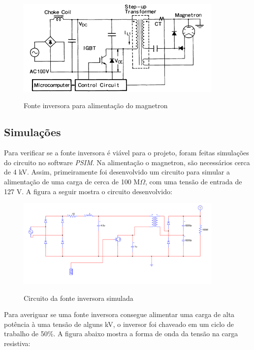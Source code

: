 \begin{figure}[!htb]
    \centering
    \caption{Fonte inversora para alimentação do magnetron}
    \includegraphics[width=0.9\textwidth]{./dados/figuras/font_inverter}
    \label{fig:figura-inverter}
\end{figure}

\subsection{Simulações}
\label{sec:simulations}

Para verificar se a fonte inversora é viável para o projeto, foram feitas simulações do circuito no software \textit{PSIM}. Na alimentação o magnetron, são necessários cerca de 4 kV. Assim, primeiramente foi desenvolvido um circuito para simular a alimentação de uma carga de cerca de 100 M$\Omega$, com uma tensão de entrada de 127 V. A figura a seguir mostra o circuito desenvolvido:

\begin{figure}[!htb]
    \centering
    \caption{Circuito da fonte inversora simulada}
    \includegraphics[width=0.9\textwidth]{./dados/figuras/psim1}
    \label{fig:circ_sim_1}
\end{figure}

Para averiguar se uma fonte inversora consegue alimentar uma carga de alta potência à uma tensão de alguns kV, o inversor foi chaveado em um ciclo de trabalho de 50\%. A figura abaixo mostra a forma de onda da tensão na carga resistiva:

